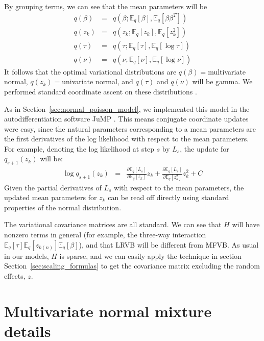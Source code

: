 \documentclass{article}\usepackage[]{graphicx}\usepackage[]{color}
\newcommand{\mysec}[1]{Section~\ref{sec:#1}}
\newcommand{\constant}{C} %
\theoremstyle{plain}
\newcommand{\mbeq}{\mathbb{E}_{q}}
\begin{document}
%
By grouping terms, we can see that the mean parameters will be
%
\begin{eqnarray*}
q\left(\beta\right) & = & q\left(\beta;\mbeq\left[\beta\right],\mbeq\left[\beta\beta^{T}\right]\right)\\
q\left(z_{k}\right) & = & q\left(z_{k};\mbeq\left[z_{k}\right],\mbeq\left[z_{k}^{2}\right]\right)\\
q\left(\tau\right) & = & q\left(\tau;\mbeq\left[\tau\right],\mbeq\left[\log\tau\right]\right)\\
q\left(\nu\right) & = & q\left(\nu;\mbeq\left[\nu\right],\mbeq\left[\log\nu\right]\right)
\end{eqnarray*}
%
It follows that the optimal variational distributions are $q\left(\beta\right)=$multivariate
normal, $q\left(z_{k}\right)=$univariate normal, and $q\left(\tau\right)$
and $q\left(\nu\right)$ will be gamma. We performed standard coordinate
ascent on these distributions \citep{bishop:2006:pattern}.

As in \mysec{normal_poisson_model}, we implemented this model in the
autodifferentiation software JuMP \citep{JuMP:LubinDunningIJOC}.
This means conjugate coordinate updates were easy, since the natural
parameters corresponding to a mean parameters are the first derivatives
of the log likelihood with respect to the mean parameters. For example,
denoting the log likelihood at step $s$ by $L_{s}$, the update for
$q_{s+1}\left(z_{k}\right)$ will be:
%
\begin{eqnarray*}
\log q_{s+1}\left(z_{k}\right) & = & \frac{\partial\mbeq\left[L_{s}\right]}{\partial\mbeq\left[z_{k}\right]}z_{k}+\frac{\partial\mbeq\left[L_{s}\right]}{\partial\mbeq\left[z_{k}^{2}\right]}z_{k}^{2}+\constant
\end{eqnarray*}
%
Given the partial derivatives of $L_{s}$ with respect to the mean
parameters, the updated mean parameters for $z_{k}$ can be read off
directly using standard properties of the normal distribution.

The variational covariance matrices are all standard. We can see that
$H$ will have nonzero terms in general (for example, the three-way
interaction $\mbeq\left[\tau\right]\mbeq\left[z_{k\left(n\right)}\right]\mbeq\left[\beta\right]$),
and that LRVB will be different from MFVB. As usual in our models,
$H$ is sparse, and we can easily apply the technique in section \mysec{scaling_formulas}
to get the covariance matrix excluding the random effects, $z$.

\section{Multivariate normal mixture details} \label{app:mvn_details}
\end{document}
